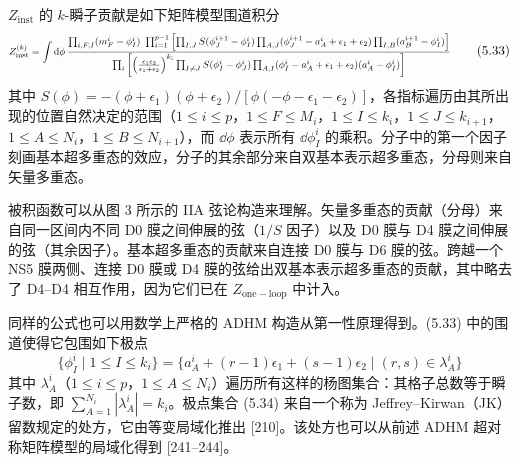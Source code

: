 
$Z_{\mathrm{inst}}$ 的 $k$-瞬子贡献是如下矩阵模型围道积分
\begin{equation}
  \resizebox{0.985\textwidth}{!}{$\displaystyle Z^{(k)}_{\mathrm{inst}} = \int \dd\phi\,
  \dfrac{\prod_{i,F,I}(m^i_F-\phi^i_I)\ \prod_{i=1}^{p-1}\left[\prod_{I,J}S(\phi^{i+1}_J-\phi^i_I)\prod_{A,J}(\phi^{i+1}_J-a^i_A+\epsilon_1+\epsilon_2)\prod_{I,B}(a^{i+1}_B-\phi^i_I)\right]}
  {\prod_i\left[\left(\frac{\epsilon_1\epsilon_2}{\epsilon_1+\epsilon_2}\right)^{k_i}\prod_{I\neq J}S(\phi^i_I-\phi^i_J)\prod_{A,I}(\phi^i_I-a^i_A+\epsilon_1+\epsilon_2)(a^i_A-\phi^i_I)\right]}$}
  \tag{5.33}
\end{equation}
其中 $S(\phi)=-(\phi+\epsilon_1)(\phi+\epsilon_2)/[\phi(-\phi-\epsilon_1-\epsilon_2)]$，各指标遍历由其所出现的位置自然决定的范围（$1\le i\le p$，$1\le F\le M_i$，$1\le I\le k_i$，$1\le J\le k_{i+1}$，$1\le A\le N_i$，$1\le B\le N_{i+1}$），而 $\dd\phi$ 表示所有 $\dd\phi^i_I$ 的乘积。分子中的第一个因子刻画基本超多重态的效应，分子的其余部分来自双基本表示超多重态，分母则来自矢量多重态。

被积函数可以从图 3 所示的 IIA 弦论构造来理解。矢量多重态的贡献（分母）来自同一区间内不同 D0 膜之间伸展的弦（$1/S$ 因子）以及 D0 膜与 D4 膜之间伸展的弦（其余因子）。基本超多重态的贡献来自连接 D0 膜与 D6 膜的弦。跨越一个 NS5 膜两侧、连接 D0 膜或 D4 膜的弦给出双基本表示超多重态的贡献，其中略去了 D4--D4 相互作用，因为它们已在 $Z_{\mathrm{one-loop}}$ 中计入。


同样的公式也可以用数学上严格的 ADHM 构造从第一性原理得到。(5.33) 中的围道使得它包围如下极点
\begin{equation}
  \{\phi^i_I\mid 1\le I\le k_i\} = \{a^i_A+(r-1)\epsilon_1+(s-1)\epsilon_2\mid (r,s)\in\lambda^i_A\}
  \tag{5.34}
\end{equation}
其中 $\lambda^i_A$（$1\le i\le p$，$1\le A\le N_i$）遍历所有这样的杨图集合：其格子总数等于瞬子数，即 $\sum_{A=1}^{N_i}|\lambda^i_A|=k_i$。极点集合 (5.34) 来自一个称为 Jeffrey--Kirwan（JK）留数规定的处方，它由等变局域化推出 [210]。该处方也可以从前述 ADHM 超对称矩阵模型的局域化得到 [241--244]。

